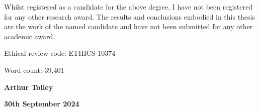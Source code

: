 Whilst registered as a candidate for the above degree, I have not been registered for any other research award. The results and conclusions embodied in this thesis are the work of the named candidate and have not been submitted for any other academic award.

\vspace{\baselineskip}
\noindent Ethical review code: ETHICS-10374

\vspace{\baselineskip}
\noindent Word count: 39,401

\noindent\hrulefill

\vspace{\baselineskip}
\noindent \textbf{Arthur Tolley}

\noindent \textbf{30th September 2024}